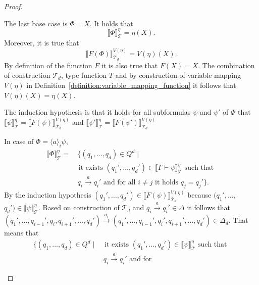 \begin{proof}
\begin{compactitem}
        \item The last base case is $\Phi = X$. It holds that
        \[\llbracket \Phi \rrbracket^\eta_\mathcal{T} = \eta(X).\]
        Moreover, it is true that
        \[\llbracket F(\Phi) \rrbracket^{V(\eta)}_{\mathcal{T}_d} = V(\eta)(X).\]
        By definition of the function $F$ it is also true that $F(X) = X$. The combination of construction $\mathcal{T}_d$, type
        function $T$ and by construction of variable mapping $V(\eta)$ in
        Definition~\ref{definition:variable_mapping_function} it follows that $V(\eta)(X) = \eta(X)$. 
    \end{compactitem}
    The induction hypothesis is that it holds for all subformulas $\psi$ and $\psi'$ of $\Phi$ that $\llbracket
    \psi \rrbracket^\eta_\mathcal{T} = \llbracket F(\psi)
    \rrbracket^{V(\eta)}_{\mathcal{T}_d}$ and $\llbracket
    \psi' \rrbracket^\eta_\mathcal{T} = \llbracket F(\psi') 
    \rrbracket^{V(\eta)}_{\mathcal{T}_d}$
    \begin{compactitem}
        \item In case of $\Phi = \langle a \rangle_i \psi$,
        \begin{align*}
            \llbracket \Phi \rrbracket^\eta_\mathcal{T} = &\,
            \{(q_1, \dots, q_d) \in Q^d \mid \\&\text{ it exists } ({q_1}', \dots, {q_d}') \in \llbracket \Gamma
                \vdash \psi 
                \rrbracket^\eta_\mathcal{T} \text{ such that }\\&\,q_i \overset{a}{\rightarrow} {q_i}' \text{ and for
            all
            } i \neq j
            \text{ it holds } q_j =
                {q_j}'\}.
        \end{align*}
        By the induction hypothesis $({q_1}', \dots, {q_d}') \in \llbracket F(\psi) \rrbracket^{V(\eta)}_{\mathcal{T}_d}$ because $({q_1}', \dots,$ $ {q_d}') \in \llbracket \psi \rrbracket^\eta_\mathcal{T}$. Based on construction of $\mathcal{T}_d$
        and $q_i \overset{a}{\rightarrow} {q_i}' \in \Delta$ it follows that $({q_1}', \dots, {q_{i - 1}'}, q_i,
        {q_{i + 1}'}, \dots, {q_d}') \overset{a_i}{\rightarrow} ({q_1}', \dots, {q_{i - 1}'}, {q_i}',
        {q_{i + 1}'}, \dots, {q_d}') \in \Delta_d$. That means that
        \begin{align*}
            \{(q_1, \dots, q_d) \in Q^d \mid &\text{ it exists } ({q_1}', \dots, {q_d}') \in \llbracket \psi 
            \rrbracket^\eta_\mathcal{T} \text{ such that }\\&\,q_i \overset{a}{\rightarrow} {q_i}' \text{ and for
}
\end{align*}
\end{compactitem}
\end{proof}
